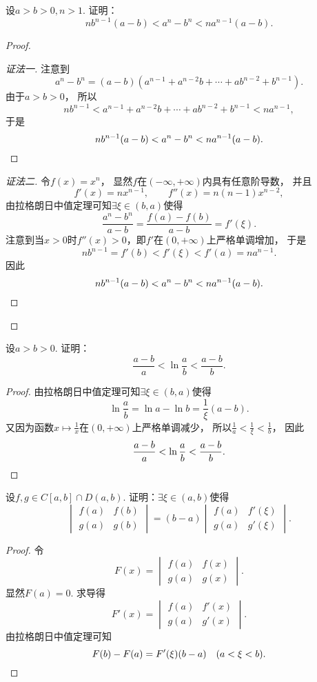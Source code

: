 \begin{example}
设\(a>b>0,n>1\).
证明：\[
	n b^{n-1} (a-b) < a^n-b^n < n a^{n-1} (a-b).
\]
\begin{proof}
\begin{proof}[证法一]
注意到\[
	a^n-b^n
	= (a-b)(a^{n-1} + a^{n-2} b + \dotsb + a b^{n-2} + b^{n-1}).
\]
由于\(a>b>0\)，
所以\[
	n b^{n-1} < a^{n-1} + a^{n-2} b + \dotsb + a b^{n-2} + b^{n-1} < n a^{n-1},
\]
于是\[
	n b^{n-1} (a-b) < a^n-b^n < n a^{n-1} (a-b).
	\qedhere
\]
\end{proof}
\begin{proof}[证法二]
令\(f(x) = x^n\)，
显然\(f\)在\((-\infty,+\infty)\)内具有任意阶导数，
并且\[
	f'(x) = n x^{n-1},
	\qquad
	f''(x) = n(n-1) x^{n-2},
\]
由拉格朗日中值定理可知\(\exists\xi\in(b,a)\)使得\[
	\frac{a^n-b^n}{a-b}
	= \frac{f(a)-f(b)}{a-b}
	= f'(\xi).
\]
注意到当\(x>0\)时\(f''(x)>0\)，即\(f'\)在\((0,+\infty)\)上严格单调增加，
于是\[
	n b^{n-1} = f'(b) < f'(\xi) < f'(a) = n a^{n-1}.
\]
因此\[
	n b^{n-1} (a-b) < a^n-b^n < n a^{n-1} (a-b).
	\qedhere
\]
\end{proof}\let\qed\relax
\end{proof}
\end{example}
\begin{example}
设\(a>b>0\).
证明：\[
	\frac{a-b}{a} < \ln\frac{a}{b} < \frac{a-b}{b}.
\]
\begin{proof}
由拉格朗日中值定理可知\(\exists\xi\in(b,a)\)使得\[
	\ln\frac{a}{b}
	= \ln a - \ln b
	= \frac1\xi (a-b).
\]
又因为函数\(x \mapsto \frac1x\)在\((0,+\infty)\)上严格单调减少，
所以\(\frac1a < \frac1\xi < \frac1b\)，
因此\[
	\frac{a-b}{a} < \ln\frac{a}{b} < \frac{a-b}{b}.
	\qedhere
\]
\end{proof}
\end{example}
\begin{example}
设\(f,g \in C[a,b] \cap D(a,b)\).
证明：\(\exists\xi\in(a,b)\)使得\[
	\begin{vmatrix}
		f(a) & f(b) \\
		g(a) & g(b)
	\end{vmatrix}
	= (b-a) \begin{vmatrix}
		f(a) & f'(\xi) \\
		g(a) & g'(\xi)
	\end{vmatrix}.
\]
\begin{proof}
令\[
	F(x) = \begin{vmatrix}
		f(a) & f(x) \\
		g(a) & g(x)
	\end{vmatrix}.
\]
显然\(F(a) = 0\).
求导得\[
	F'(x) = \begin{vmatrix}
		f(a) & f'(x) \\
		g(a) & g'(x)
	\end{vmatrix}.
\]
由拉格朗日中值定理可知\[
	F(b) - F(a) = F'(\xi) (b-a)
	\quad(a<\xi<b).
	\qedhere
\]
\end{proof}
\end{example}
